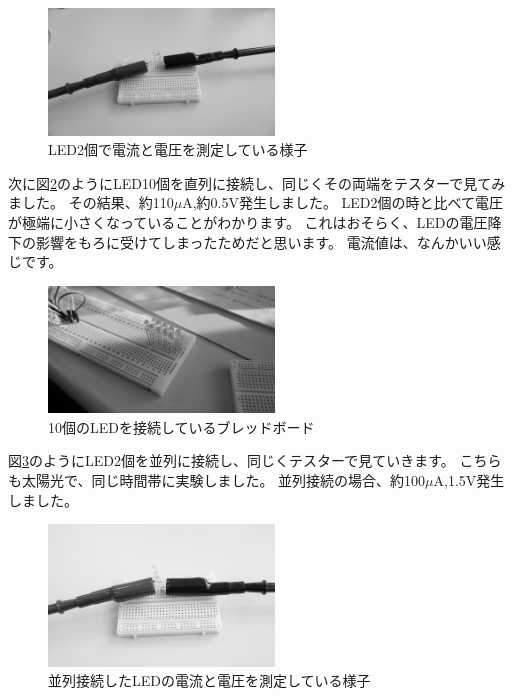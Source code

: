 \begin{figure}[htbp]
    \centering
    \includegraphics[width=60mm]{./assets/mouse/gray/12.JPG}
    \caption{LED2個で電流と電圧を測定している様子}
    \label{fig:led2}
\end{figure}

次に図\ref{fig:led10}のようにLED10個を直列に接続し、同じくその両端をテスターで見てみました。
その結果、約110$\mu\si\ampere$,約0.5$\si\volt$発生しました。
LED2個の時と比べて電圧が極端に小さくなっていることがわかります。
これはおそらく、LEDの電圧降下の影響をもろに受けてしまったためだと思います。
電流値は、なんかいい感じです。


\begin{figure}[htbp]
    \centering
    \includegraphics[width=60mm]{./assets/mouse/gray/4.JPG}
    \caption{10個のLEDを接続しているブレッドボード}
    \label{fig:led10}
\end{figure}

図\ref{fig:led_par}のようにLED2個を並列に接続し、同じくテスターで見ていきます。
こちらも太陽光で、同じ時間帯に実験しました。
並列接続の場合、約100$\mu\si\ampere$,1.5$\si\volt$発生しました。


\begin{figure}[htbp]
    \centering
    \includegraphics[width=60mm]{./assets/mouse/gray/13.JPG}
    \caption{並列接続したLEDの電流と電圧を測定している様子}
    \label{fig:led_par}
\end{figure}


